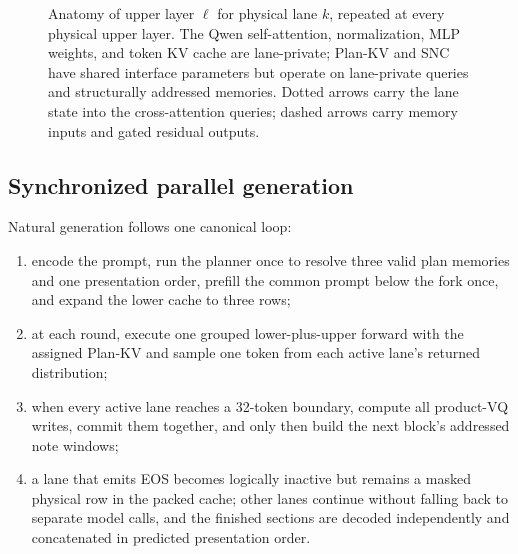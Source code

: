 \documentclass[10pt]{article}
\begin{document}
\begin{figure}[t]
\caption{Anatomy of upper layer \(\ell\) for physical lane \(k\), repeated at
every physical upper layer. The Qwen self-attention, normalization, MLP
weights, and token KV cache are lane-private; Plan-KV and SNC have shared
interface parameters but operate on lane-private queries and structurally
addressed memories. Dotted arrows carry the lane state into the
cross-attention queries; dashed arrows carry memory inputs and gated residual
outputs.}
\label{fig:layer-anatomy}
\end{figure}

\subsection{Synchronized parallel generation}
\label{sec:inference}

Natural generation follows one canonical loop:

\begin{enumerate}[leftmargin=*,itemsep=0.2em]
    \item encode the prompt, run the planner once to resolve three valid
    plan memories and one presentation order, prefill the common prompt
    below the fork once, and expand the lower cache to three rows;

    \item at each round, execute one grouped lower-plus-upper forward with
    the assigned Plan-KV and sample one token from each active lane's
    returned distribution;

    \item when every active lane reaches a 32-token boundary, compute all
    product-VQ writes, commit them together, and only then build the next
    block's addressed note windows;

    \item a lane that emits EOS becomes logically inactive but remains a
    masked physical row in the packed cache; other lanes continue without
    falling back to separate model calls, and the finished sections are
    decoded independently and concatenated in predicted presentation order.
\end{enumerate}
\end{document}
